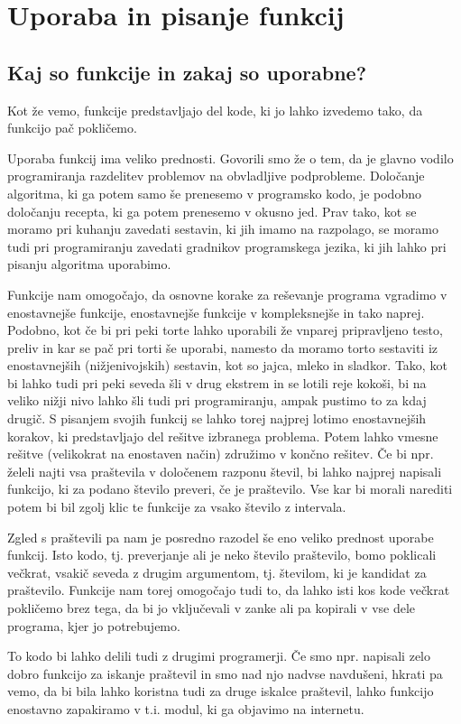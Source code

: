 \chapter{Uporaba in pisanje funkcij}
\section{Kaj so funkcije in zakaj so uporabne?}
Kot že vemo, funkcije predstavljajo del kode, ki jo lahko izvedemo tako, da funkcijo pač pokličemo. 

Uporaba funkcij ima veliko prednosti. Govorili smo že o tem, da je glavno vodilo programiranja razdelitev problemov na obvladljive podprobleme. Določanje algoritma, ki ga potem samo še prenesemo v programsko kodo, je podobno določanju recepta, ki ga potem prenesemo v okusno jed. Prav tako, kot se moramo pri kuhanju zavedati sestavin, ki jih imamo na razpolago, se moramo tudi pri programiranju zavedati gradnikov programskega jezika, ki jih lahko pri pisanju algoritma uporabimo. 

Funkcije nam omogočajo, da osnovne korake za reševanje programa vgradimo v enostavnejše funkcije, enostavnejše funkcije v kompleksnejše in tako naprej. Podobno, kot če bi pri peki torte lahko uporabili že vnparej pripravljeno testo, preliv in kar se pač pri torti še uporabi, namesto da moramo torto sestaviti iz enostavnejših (nižjenivojskih) sestavin, kot so jajca, mleko in sladkor. Tako, kot bi lahko tudi pri peki seveda šli v drug ekstrem in se lotili reje kokoši, bi na veliko nižji nivo lahko šli tudi pri programiranju, ampak pustimo to za kdaj drugič. S pisanjem svojih funkcij se lahko torej najprej lotimo enostavnejših korakov, ki predstavljajo del rešitve izbranega problema. Potem lahko vmesne rešitve (velikokrat na enostaven način) združimo v končno rešitev. Če bi npr. želeli najti vsa praštevila v določenem razponu števil, bi lahko najprej napisali funkcijo, ki za podano število preveri, če je praštevilo. Vse kar bi morali narediti potem bi bil zgolj klic te funkcije za vsako število z intervala.

Zgled s praštevili pa nam je posredno razodel še eno veliko prednost uporabe funkcij. Isto kodo, tj. preverjanje ali je neko število praštevilo, bomo poklicali večkrat, vsakič seveda z drugim argumentom, tj. številom, ki je kandidat za praštevilo. Funkcije nam torej omogočajo tudi to, da lahko isti kos kode večkrat pokličemo brez tega, da bi jo vključevali v zanke ali pa kopirali v vse dele programa, kjer jo potrebujemo. 

To kodo bi lahko delili tudi z drugimi programerji. Če smo npr. napisali zelo dobro funkcijo za iskanje praštevil in smo nad njo nadvse navdušeni, hkrati pa vemo, da bi bila lahko koristna tudi za druge iskalce praštevil, lahko funkcijo enostavno zapakiramo v t.i. modul, ki ga objavimo na internetu. 

